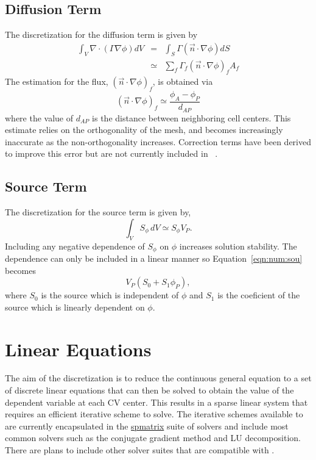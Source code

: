 \subsection{Diffusion Term}

The discretization for the diffusion term is given by
\begin{eqnarray}
\int_V \nabla \cdot (\Gamma\nabla\phi) dV & = & \int_S \Gamma (\vec{n} \cdot \nabla\phi) dS \\
& \simeq & \sum_f \Gamma_f (\vec{n} \cdot \nabla\phi)_f A_f
\label{eqn:num:dif}
\end{eqnarray}
The estimation for the flux, $(\vec{n} \cdot \nabla\phi)_f$, is
obtained via
\begin{equation}
(\vec{n} \cdot \nabla\phi)_f \simeq \frac{\phi_A-\phi_P}{d_{AP}}
\end{equation}
where the value of $d_{AP}$ is the distance between neighboring cell
centers.  This estimate relies on the orthogonality of the mesh, and
becomes increasingly inaccurate as the non-orthogonality increases.
Correction terms have been derived to improve this error but are not
currently included in \FiPy{}~\cite{croftphd}.

\subsection{Source Term}

The discretization for the source term is given by, 
\begin{equation}
\int_V S_{\phi}\,dV \simeq S_\phi V_P.
\label{eqn:num:sou}
\end{equation}
Including any negative dependence of $S_\phi$ on $\phi$ increases
solution stability. The dependence can only be included in a linear
manner so Equation~\eqref{eqn:num:sou} becomes
\begin{equation}
V_P (S_0 + S_1 \phi_P),
\end{equation}
where \( S_0 \) is the source which is independent of \( \phi \) and
\( S_1 \) is the coeficient of the source which is linearly dependent
on \( \phi \).

\section{Linear Equations}

The aim of the discretization is to reduce the continuous general
equation to a set of discrete linear equations that can then be solved
to obtain the value of the dependent variable at each CV center. This
results in a sparse linear system that requires an efficient iterative
scheme to solve. The iterative schemes available to \FiPy{} are
currently encapsulated in the \href{#id5}{spmatrix} suite of solvers
and include most common solvers such as the conjugate gradient method
and LU decomposition. There are plans to include other solver suites
that are compatible with \Python{}.

